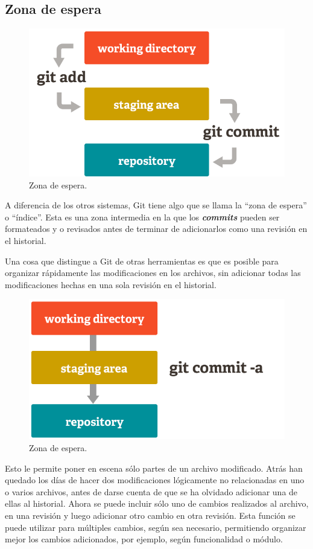 \documentclass[12pt, spanish, oneside, onecolumn, a4paper]{report}
\begin{document}
\clearpage
\subsection{Zona de espera}
\label{sec:stagingarea}

\begin{figure}
  \begin{center}
  \includegraphics[width=.6\textwidth,keepaspectratio=true]{index1.png}
  \end{center}
  \caption{Zona de espera.}
\end{figure}


A diferencia de los otros sistemas, Git tiene algo que se llama la ``zona de espera'' o ``índice''. Esta es una zona intermedia en la que los \textbf{\emph{commits}} pueden ser formateados y o revisados antes de terminar de adicionarlos como una revisión en el historial.

Una cosa que distingue a Git de otras herramientas es que es posible para organizar rápidamente las modificaciones en los archivos, sin adicionar todas las modificaciones hechas en una sola revisión en el historial.

\begin{figure}
  \begin{center}
  \includegraphics[width=.6\textwidth,keepaspectratio=true]{index2.png}
  \end{center}
  \caption{Zona de espera.}
\end{figure}

Esto le permite poner en escena sólo partes de un archivo modificado. Atrás han quedado los días de hacer dos modificaciones lógicamente no relacionadas en uno o varios archivos, antes de darse cuenta de que se ha olvidado adicionar una de ellas al historial. Ahora se puede incluir sólo uno de cambios realizados al archivo, en una revisión y luego adicionar otro cambio en otra revisión. Esta función se puede utilizar para múltiples cambios, según sea necesario, permitiendo organizar mejor los cambios adicionados, por ejemplo, según funcionalidad o módulo.
\end{document}
